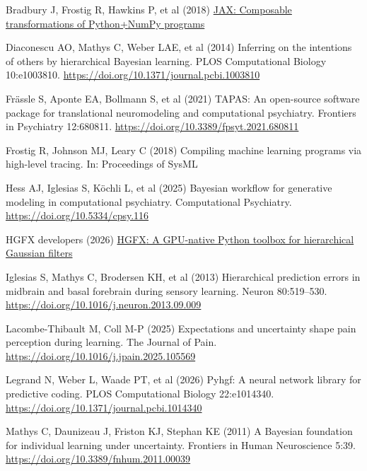 \documentclass[
  11pt,
]{article}
\newlength{\cslhangindent}
\newenvironment{CSLReferences}[2] %
 {\begin{list}{}{%
  \setlength{\itemindent}{0pt}
  \setlength{\leftmargin}{0pt}
  \setlength{\parsep}{0pt}
  \ifodd #1
   \setlength{\leftmargin}{\cslhangindent}
   \setlength{\itemindent}{-1\cslhangindent}
  \fi
  \setlength{\itemsep}{#2\baselineskip}}}
 {\end{list}}
\begin{document}
\protect{}\label{refs}
\begin{CSLReferences}{1}{1}
Bradbury J, Frostig R, Hawkins P, et al (2018)
\href{https://github.com/jax-ml/jax}{{JAX}: Composable transformations
of {Python}+{NumPy} programs}

Diaconescu AO, Mathys C, Weber LAE, et al (2014) Inferring on the
intentions of others by hierarchical {Bayesian} learning. PLOS
Computational Biology 10:e1003810.
\url{https://doi.org/10.1371/journal.pcbi.1003810}

Frässle S, Aponte EA, Bollmann S, et al (2021) {TAPAS}: An open-source
software package for translational neuromodeling and computational
psychiatry. Frontiers in Psychiatry 12:680811.
\url{https://doi.org/10.3389/fpsyt.2021.680811}

Frostig R, Johnson MJ, Leary C (2018) Compiling machine learning
programs via high-level tracing. In: Proceedings of SysML

Hess AJ, Iglesias S, Köchli L, et al (2025) Bayesian workflow for
generative modeling in computational psychiatry. Computational
Psychiatry. \url{https://doi.org/10.5334/cpsy.116}

HGFX developers (2026)
\href{https://github.com/ahmadkhanloo/hgfx}{{HGFX}: A {GPU}-native
{Python} toolbox for hierarchical {Gaussian} filters}

Iglesias S, Mathys C, Brodersen KH, et al (2013) Hierarchical prediction
errors in midbrain and basal forebrain during sensory learning. Neuron
80:519--530. \url{https://doi.org/10.1016/j.neuron.2013.09.009}

Lacombe-Thibault M, Coll M-P (2025) Expectations and uncertainty shape
pain perception during learning. The Journal of Pain.
\url{https://doi.org/10.1016/j.jpain.2025.105569}

Legrand N, Weber L, Waade PT, et al (2026) Pyhgf: A neural network
library for predictive coding. PLOS Computational Biology 22:e1014340.
\url{https://doi.org/10.1371/journal.pcbi.1014340}

Mathys C, Daunizeau J, Friston KJ, Stephan KE (2011) A {Bayesian}
foundation for individual learning under uncertainty. Frontiers in Human
Neuroscience 5:39. \url{https://doi.org/10.3389/fnhum.2011.00039}


\end{CSLReferences}
\end{document}
